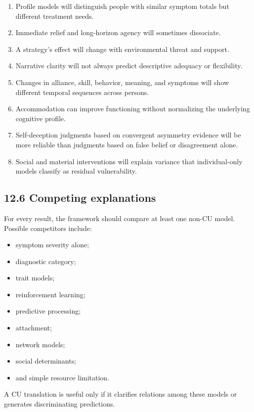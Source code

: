 \documentclass[
  11pt,
]{article}
\providecommand{\tightlist}{%
  \setlength{\itemsep}{0pt}\setlength{\parskip}{0pt}}
\begin{document}
\begin{enumerate}
\def\labelenumi{\arabic{enumi}.}
\tightlist
\item
  Profile models will distinguish people with similar symptom totals but
  different treatment needs.
\item
  Immediate relief and long-horizon agency will sometimes dissociate.
\item
  A strategy's effect will change with environmental threat and support.
\item
  Narrative clarity will not always predict descriptive adequacy or
  flexibility.
\item
  Changes in alliance, skill, behavior, meaning, and symptoms will show
  different temporal sequences across persons.
\item
  Accommodation can improve functioning without normalizing the
  underlying cognitive profile.
\item
  Self-deception judgments based on convergent asymmetry evidence will
  be more reliable than judgments based on false belief or disagreement
  alone.
\item
  Social and material interventions will explain variance that
  individual-only models classify as residual vulnerability.
\end{enumerate}

\subsection{12.6 Competing explanations}\label{competing-explanations}

For every result, the framework should compare at least one non-CU
model. Possible competitors include:

\begin{itemize}
\tightlist
\item
  symptom severity alone;
\item
  diagnostic category;
\item
  trait models;
\item
  reinforcement learning;
\item
  predictive processing;
\item
  attachment;
\item
  network models;
\item
  social determinants;
\item
  and simple resource limitation.
\end{itemize}

A CU translation is useful only if it clarifies relations among these
models or generates discriminating predictions.
\end{document}
